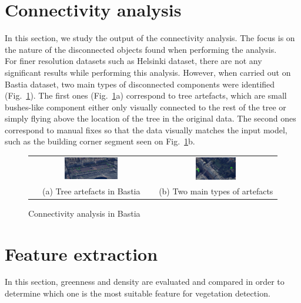 \documentclass{kththesis}
\begin{document}
\section{Connectivity analysis}
In this section, we study the output of the connectivity analysis. The focus is on the nature of the disconnected objects found when performing the analysis. \\
For finer resolution datasets such as Helsinki dataset, there are not any significant results while performing this analysis. However, when carried out on Bastia dataset, two main types of disconnected components were identified (Fig.~\ref{fig:bastia_connec_analysis_tree artefacts}). The first ones (Fig.~\ref{fig:bastia_connec_analysis_tree artefacts}a) correspond to tree artefacts, which are small bushes-like component either only visually connected to the rest of the tree or simply flying above the location of the tree in the original data. The second ones correspond to manual fixes so that the data visually matches the input model, such as the building corner segment seen on Fig.~\ref{fig:bastia_connec_analysis_tree artefacts}b. \\
\begin{figure}[H]
    \centering
    \begin{tabular}{c c}
    \includegraphics[width=0.45\textwidth]{images/Connectivity_Analysis/flying_bushes.png} & \includegraphics[width=0.35\textwidth]{images/Connectivity_Analysis/type_of_disc_objects.png} \\ 
    (a) Tree artefacts in Bastia & (b) Two main types of artefacts \\
    \end{tabular}
    \caption{Connectivity analysis in Bastia }
    \label{fig:bastia_connec_analysis_tree artefacts}
    
\end{figure}


\section{Feature extraction}
In this section, greenness and density are evaluated and compared in order to determine which one is the most suitable feature for vegetation detection. \\
\end{document}
